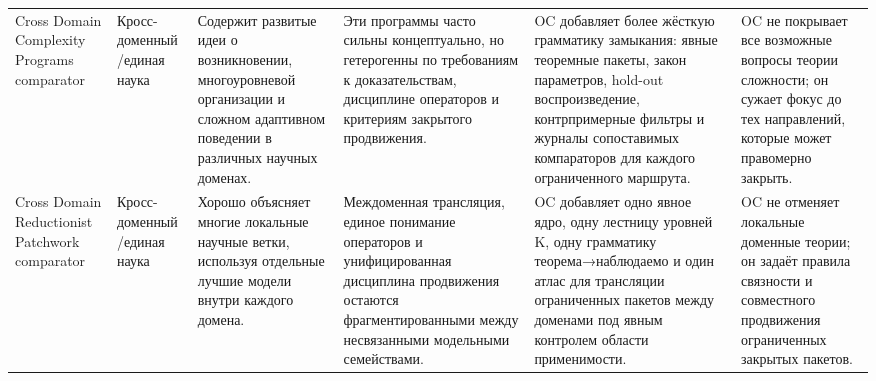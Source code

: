 \begin{longtable}{@{}L{0.17\textwidth}L{0.09\textwidth}L{0.17\textwidth}L{0.17\textwidth}L{0.20\textwidth}L{0.14\textwidth}@{}}
Cross Domain Complexity Programs comparator & Кросс-доменный /\allowbreak единая наука & Содержит развитые идеи о возникновении, многоуровневой организации и сложном адаптивном поведении в различных научных доменах. & Эти программы часто сильны концептуально, но гетерогенны по требованиям к доказательствам, дисциплине операторов и критериям закрытого продвижения. & OC добавляет более жёсткую грамматику замыкания: явные теоремные пакеты, закон параметров, hold-out воспроизведение, контрпримерные фильтры и журналы сопоставимых компараторов для каждого ограниченного маршрута. & OC не покрывает все возможные вопросы теории сложности; он сужает фокус до тех направлений, которые может правомерно закрыть. \\
Cross Domain Reductionist Patchwork comparator & Кросс-доменный /\allowbreak единая наука & Хорошо объясняет многие локальные научные ветки, используя отдельные лучшие модели внутри каждого домена. & Междоменная трансляция, единое понимание операторов и унифицированная дисциплина продвижения остаются фрагментированными между несвязанными модельными семействами. & OC добавляет одно явное ядро, одну лестницу уровней K, одну грамматику теорема→наблюдаемо и один атлас для трансляции ограниченных пакетов между доменами под явным контролем области применимости. & OC не отменяет локальные доменные теории; он задаёт правила связности и совместного продвижения ограниченных закрытых пакетов. \\
\bottomrule
\end{longtable}

